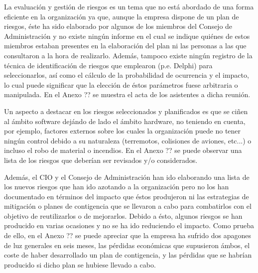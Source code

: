 La evaluación y gestión de riesgos es un tema que no está abordado de
una forma eficiente en la organización ya que, aunque la empresa
dispone de un plan de riesgos, éste ha sido elaborado por algunos de
los miembros del Consejo de Administración y no existe ningún informe
en el cual se indique quiénes de estos miembros estaban presentes en la
elaboración del plan ni las personas a las que consultaron a la hora
de realizarlo. Además, tampoco existe ningún registro de la técnica de
identificación de riesgos que emplearon (p.e. Delphi) para
seleccionarlos, así como el cálculo de la probabilidad de ocurrencia y
el impacto, lo cual puede significar que la elección de éstos parámetros
fuese arbitraria o manipulada. En el Anexo ?? se muestra el acta de
los asistentes a dicha reunión. 

Un aspecto a destacar en los riesgos seleccionados y planificados es
que se ciñen al ámbito software dejándo de lado el ámbito hardware, no
teniendo en  cuenta, por ejemplo, factores externos sobre los cuales
la organización puede no tener ningún control debido a su naturaleza
(terremotos, colisiones de aviones, etc...) o incluso el robo de material o
incendios. En el Anexo ?? se puede observar una lista de los riesgos
que deberían ser revisados y/o considerados.

Además, el CIO y el Consejo de Administración han ido elaborando una
lista de los nuevos riesgos que han ido azotando a la organización
pero no los han documentado en términos del impacto que éstos
produjeron ni las estrategias de mitigación o planes de contigencia
que se llevaron a cabo para combatirlos con el objetivo de reutilizarlos
o de mejorarlos. Debido a ésto, algunos riesgos se han producido
en varias ocasiones y no se ha ido reduciendo el impacto. Como prueba
de ello, en el Anexo ?? se puede apreciar que la empresa ha sufrido
dos apagones de luz generales en seis meses, las pérdidas económicas
que supusieron ámbos, el coste de haber desarrollado un plan de
contigencia, y las pérdidas que se habrían producido si dicho plan se
hubiese llevado a cabo.

